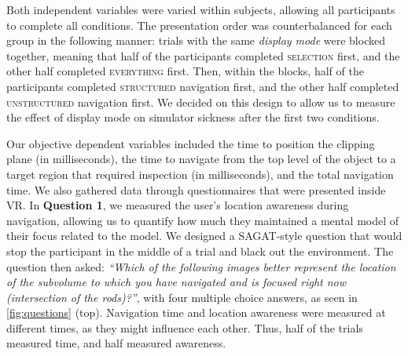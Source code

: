 

Both independent variables were varied within subjects, allowing all participants to complete all conditions. The presentation order was counterbalanced for each group in the following manner: trials with the same \textit{display mode} were blocked together, meaning that half of the participants completed \textsc{selection} first, and the other half completed \textsc{everything} first. Then, within the blocks, half of the participants completed \textsc{structured} navigation first, and the other half completed \textsc{unstructured} navigation first. We decided on this design to allow us to measure the effect of display mode on simulator sickness after the first two conditions.

Our objective dependent variables included the time to position the clipping plane (in milliseconds), the time to navigate from the top level of the object to a target region that required inspection (in milliseconds), and the total navigation time. We also gathered data through questionnaires that were presented inside VR. In \textbf{Question 1}, we measured the user's location awareness during navigation, allowing us to quantify how much they maintained a mental model of their focus related to the model. We designed a SAGAT-style question \cite{endsley_situation_1988} that would stop the participant in the middle of a trial and black out the environment. The question then asked: \textit{``Which of the following images better represent the location of the subvolume to which you have navigated and is focused right now (intersection of the rods)?''}, with four multiple choice answers, as seen in \autoref{fig:questions} (top). Navigation time and location awareness were measured at different times, as they might influence each other. Thus, half of the trials measured time, and half measured awareness.

